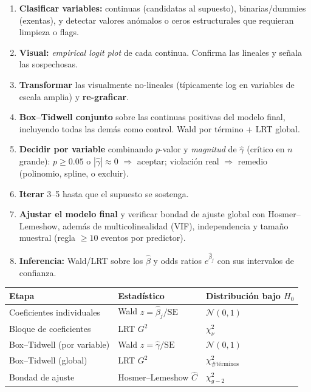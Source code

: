 \documentclass[11pt]{article}
\theoremstyle{plain}
\theoremstyle{definition}
\theoremstyle{remark}
\newcommand{\Nor}{\mathcal{N}}
\begin{document}
\begin{enumerate}[label=\textbf{\arabic*.}]
  \item \textbf{Clasificar variables:} continuas (candidatas al supuesto),
        binarias/dummies (exentas), y detectar valores anómalos o ceros
        estructurales que requieran limpieza o flags.
  \item \textbf{Visual:} \emph{empirical logit plot} de cada continua. Confirma
        las lineales y señala las sospechosas.
  \item \textbf{Transformar} las visualmente no-lineales (típicamente log en
        variables de escala amplia) y \textbf{re-graficar}.
  \item \textbf{Box--Tidwell conjunto} sobre las continuas positivas del modelo
        final, incluyendo todas las demás como control. Wald por término + LRT
        global.
  \item \textbf{Decidir por variable} combinando $p$-valor y \emph{magnitud} de
        $\hat\gamma$ (crítico en $n$ grande): $p\ge0.05$ o $|\hat\gamma|\approx0$
        $\Rightarrow$ aceptar; violación real $\Rightarrow$ remedio (polinomio,
        spline, o excluir).
  \item \textbf{Iterar} 3--5 hasta que el supuesto se sostenga.
  \item \textbf{Ajustar el modelo final} y verificar bondad de ajuste global con
        Hosmer--Lemeshow, además de multicolinealidad (VIF), independencia y
        tamaño muestral (regla $\geq 10$ eventos por predictor).
  \item \textbf{Inferencia:} Wald/LRT sobre los $\hat\beta$ y odds ratios
        $e^{\hat\beta_j}$ con sus intervalos de confianza.
\end{enumerate}

\begin{center}
\begin{tabular}{lll}
\toprule
Etapa & Estadístico & Distribución bajo $H_0$ \\
\midrule
Coeficientes individuales & Wald $z=\hat\beta_j/\text{SE}$ & $\Nor(0,1)$ \\
Bloque de coeficientes & LRT $G^2$ & $\chi^2_\nu$ \\
Box--Tidwell (por variable) & Wald $z=\hat\gamma/\text{SE}$ & $\Nor(0,1)$ \\
Box--Tidwell (global) & LRT $G^2$ & $\chi^2_{\#\text{términos}}$ \\
Bondad de ajuste & Hosmer--Lemeshow $\hat C$ & $\chi^2_{g-2}$ \\
\bottomrule
\end{tabular}
\end{center}
\end{document}
